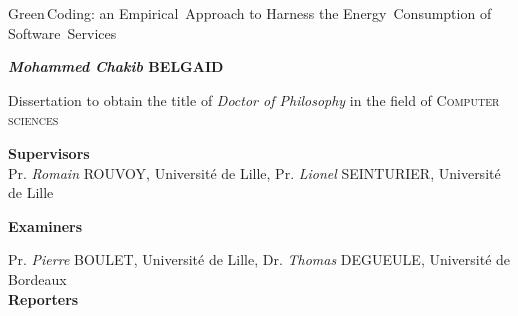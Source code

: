 \begin{center}
    \LARGE
    Green\,Coding: an Empirical~Approach to Harness the Energy~Consumption of Software~Services

    \vspace{.8cm}
    \Large
    \textbf{\emph{Mohammed Chakib} \textsc{BELGAID}}
    \vspace{0.8cm}
    \large

    Dissertation to obtain the title of \emph{Doctor of Philosophy} in the field of \textsc{Computer sciences}\\
    \vspace{0.8cm}

    \large
    \textbf{Supervisors}\\
    \RaggedRight
    \vspace{.5cm}
    \normalsize
    Pr. \emph{Romain} \textsc{ROUVOY}, Université de Lille,\newline
    Pr. \emph{Lionel} \textsc{SEINTURIER}, Université de Lille
    \endminipage
    \vspace{0.6cm}

    \large
    \textbf{Examiners}\\
    \normalsize

    \vspace{.5cm}


    Pr. \emph{Pierre} \textsc{BOULET}, Université de Lille,\newline
    Dr. \emph{Thomas} \textsc{DEGUEULE}, Université de Bordeaux
    \endminipage
    \vspace{.5cm}
    \\
    \large
    \textbf{Reporters}\\


\end{center}

